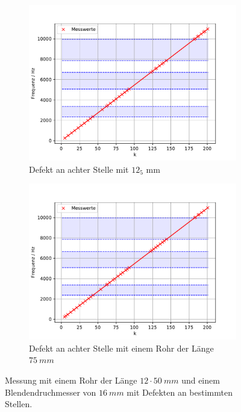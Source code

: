 \begin{figure}
   \begin{subfigure}{0.48\textwidth}
    \centering
    \includegraphics[width=1.1\textwidth]{max3.pdf}
    \caption{Defekt an achter Stelle mit $12_5$ mm}
    \label{fig.Aufgabe123}
   \end{subfigure}
   \begin{subfigure}{0.48\textwidth}
    \centering
    \includegraphics[width=1.1\textwidth]{max4.pdf}
    \caption{Defekt an achter Stelle mit einem Rohr der Länge $\SI{75}{mm}$}
    \label{fig.Aufgabe124}
   \end{subfigure}
   \caption{Messung mit einem Rohr der Länge $12 \cdot \SI{50}{mm}$ und einem Blendendruchmesser von $\SI{16}{mm}$ mit Defekten an bestimmten Stellen.}
   \label{fig.Aufgabe12}
  \end{figure}
